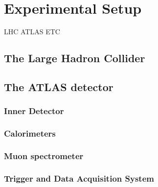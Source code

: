 \chapter{Experimental Setup}\label{chap:expSetup}
LHC ATLAS ETC
\section{The Large Hadron Collider}

\section{The ATLAS detector}

\subsection{Inner Detector}

\subsection{Calorimeters}

\subsection{Muon spectrometer}

\subsection{Trigger and Data Acquisition System}